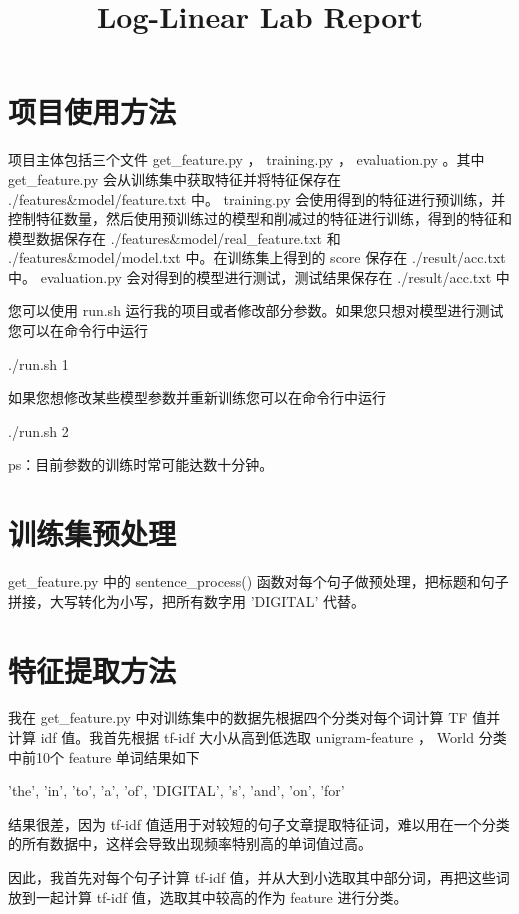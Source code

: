 \documentclass[12pt,letterpaper]{article}
\title{Log-Linear Lab Report}
\begin{document}
\maketitle

\section{项目使用方法}

项目主体包括三个文件 get\_feature.py ， training.py ， evaluation.py 。其中 get\_feature.py 会从训练集中获取特征并将特征保存在 ./features\&model/feature.txt 中。 training.py 会使用得到的特征进行预训练，并控制特征数量，然后使用预训练过的模型和削减过的特征进行训练，得到的特征和模型数据保存在 ./features\&model/real\_feature.txt 和 ./features\&model/model.txt 中。在训练集上得到的 score 保存在 ./result/acc.txt 中。 evaluation.py 会对得到的模型进行测试，测试结果保存在 ./result/acc.txt 中

您可以使用 run.sh 运行我的项目或者修改部分参数。如果您只想对模型进行测试您可以在命令行中运行

./run.sh 1 

如果您想修改某些模型参数并重新训练您可以在命令行中运行

./run.sh 2 

ps：目前参数的训练时常可能达数十分钟。

\section{训练集预处理}

get\_feature.py 中的 sentence\_process() 函数对每个句子做预处理，把标题和句子拼接，大写转化为小写，把所有数字用 'DIGITAL' 代替。

\section{特征提取方法}

我在 get\_feature.py 中对训练集中的数据先根据四个分类对每个词计算 TF 值并计算 idf 值。我首先根据 tf-idf 大小从高到低选取 unigram-feature ， World 分类中前10个 feature 单词结果如下

'the', 'in', 'to', 'a', 'of', 'DIGITAL', 's', 'and', 'on', 'for'

结果很差，因为 tf-idf 值适用于对较短的句子文章提取特征词，难以用在一个分类的所有数据中，这样会导致出现频率特别高的单词值过高。

因此，我首先对每个句子计算 tf-idf 值，并从大到小选取其中部分词，再把这些词放到一起计算 tf-idf 值，选取其中较高的作为 feature 进行分类。
\end{document}
